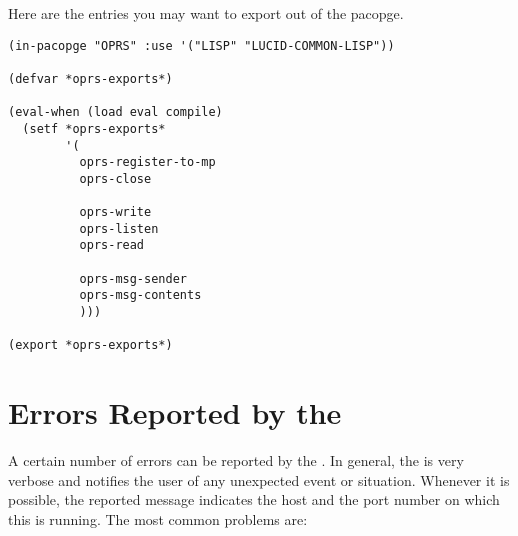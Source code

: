Here are the entries you may want to export out of the 
pacopge.

\begin{verbatim}
(in-pacopge "OPRS" :use '("LISP" "LUCID-COMMON-LISP"))

(defvar *oprs-exports*)

(eval-when (load eval compile)
  (setf *oprs-exports*
        '(
          oprs-register-to-mp
          oprs-close

          oprs-write
          oprs-listen
          oprs-read

          oprs-msg-sender
          oprs-msg-contents
          )))

(export *oprs-exports*)
\end{verbatim}

\section{Errors Reported by the \MPA{}}

A certain number of errors can be reported by the \MPA{}. In
general, the \MPA{} is very verbose and notifies the user of
any unexpected event or situation. Whenever it is possible, the reported
message  indicates the host and the port number on which this \MPA{} is
running. The most common problems are: 

